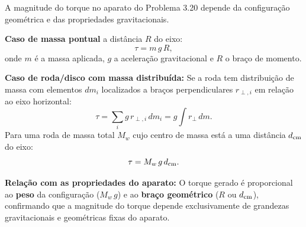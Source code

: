 A magnitude do torque no aparato do Problema 3.20 depende da configuração geométrica e das propriedades gravitacionais.

\textbf{Caso de massa pontual} a distância $R$ do eixo:
\[
\tau = m\,g\,R,
\]
onde $m$ é a massa aplicada, $g$ a aceleração gravitacional e $R$ o braço de momento.

\textbf{Caso de roda/disco com massa distribuída:}
Se a roda tem distribuição de massa com elementos $dm_i$ localizados a braços perpendiculares $r_{\perp,i}$ em relação ao eixo horizontal:
\[
\tau = \sum_i g\,r_{\perp,i}\,dm_i = g\int r_\perp\,dm.
\]
Para uma roda de massa total $M_w$ cujo centro de massa está a uma distância $d_{\rm cm}$ do eixo:
\[
\tau = M_w\,g\,d_{\rm cm}.
\]

\textbf{Relação com as propriedades do aparato:}
O torque gerado é proporcional ao \textbf{peso} da configuração ($M_w\,g$) e ao \textbf{braço geométrico} ($R$ ou $d_{\rm cm}$), confirmando que a magnitude do torque depende exclusivamente de grandezas gravitacionais e geométricas fixas do aparato.

